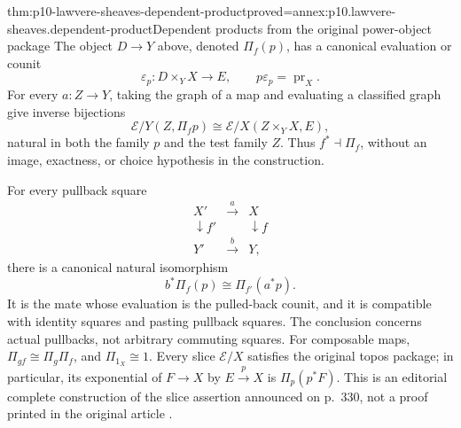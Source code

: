 \begin{hbtheorem}{thm:p10-lawvere-sheaves-dependent-product}{proved=annex:p10.lawvere-sheaves.dependent-product}{Dependent products from the original power-object package}
The object \(D\to Y\) above, denoted \(\Pi_f(p)\), has
a canonical evaluation or counit
\[
             \varepsilon_p:D\times_Y X\longrightarrow E,
             \qquad p\varepsilon_p=\operatorname{pr}_X.
\]
For every \(a:Z\to Y\), taking the graph of a map and
evaluating a classified graph give inverse bijections
\[
 \mathcal E/Y(Z,\Pi_fp)
             \cong\mathcal E/X(Z\times_Y X,E),
\]
natural in both the family \(p\) and the test family \(Z\).
Thus \(f^*\dashv\Pi_f\), without an image, exactness, or
choice hypothesis in the construction.

For every pullback square
\[
\begin{array}{ccc}
 X'&\xrightarrow{\ a\ }&X\\
 \downarrow{\scriptstyle f'}&&\downarrow{\scriptstyle f}\\
 Y'&\xrightarrow{\ b\ }&Y,
\end{array}
\]
there is a canonical natural isomorphism
\[
                  b^*\Pi_f(p)\cong\Pi_{f'}(a^*p).
\]
It is the mate whose evaluation is the pulled-back counit, and
it is compatible with identity squares and pasting pullback
squares.  The conclusion concerns actual pullbacks, not arbitrary
commuting squares.  For composable maps,
\(\Pi_{gf}\cong\Pi_g\Pi_f\), and \(\Pi_{1_X}\cong1\).
Every slice \(\mathcal E/X\) satisfies the original topos
package; in particular, its exponential of \(F\to X\) by
\(E\xrightarrow{p}X\) is \(\Pi_p(p^*F)\).
This is an editorial complete construction of the slice assertion
announced on p.~330, not a proof printed in the original article
\cite[p.~330]{Lawvere1970}.
\end{hbtheorem}

